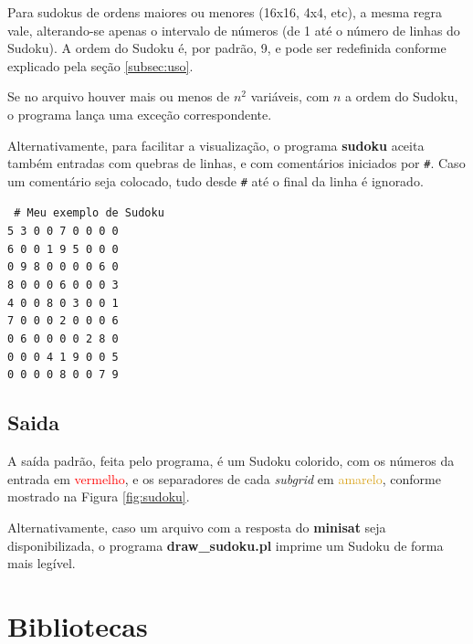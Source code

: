 \documentclass[a4paper]{article}
\begin{document}
    Para sudokus de ordens maiores ou menores (16x16, 4x4, etc), a mesma
    regra vale, alterando-se apenas o intervalo de números (de 1 até o 
    número de linhas do Sudoku). A ordem do Sudoku é, por padrão, 9, e 
    pode ser redefinida conforme explicado pela seção \ref{subsec:uso}.
    
    Se no arquivo houver mais ou menos de $n^2$ variáveis, com $n$ a 
    ordem do Sudoku, o programa lança uma exceção correspondente.
    
    Alternativamente, para facilitar a visualização, o programa 
    \textbf{sudoku} aceita também entradas com quebras de linhas, 
    e com comentários iniciados por \texttt{\#}. Caso um comentário 
    seja colocado, tudo desde \texttt{\#} até o final da linha é ignorado. 
    
    \begin{center}
    \texttt
    {
        \# Meu exemplo de Sudoku \\
        5 3 0 0 7 0 0 0 0 \\
        6 0 0 1 9 5 0 0 0 \\
        0 9 8 0 0 0 0 6 0 \\
        8 0 0 0 6 0 0 0 3 \\
        4 0 0 8 0 3 0 0 1 \\
        7 0 0 0 2 0 0 0 6 \\
        0 6 0 0 0 0 2 8 0 \\
        0 0 0 4 1 9 0 0 5 \\
        0 0 0 0 8 0 0 7 9 
    }
    \end{center}
    
  \subsection{Saida}
  \label{subsec:saida}
  
    A saída padrão, feita pelo programa, é um Sudoku colorido, com os
    números da entrada em \textcolor{red}{vermelho}, e os separadores 
    de cada \emph{subgrid} em \textcolor{Goldenrod}{amarelo}, conforme 
    mostrado na Figura \ref{fig:sudoku}.
    
    Alternativamente, caso um arquivo com a resposta do \textbf{minisat}
    seja disponibilizada, o programa \textbf{draw\_sudoku.pl} imprime um
    Sudoku de forma mais legível.

\newpage %

\section{Bibliotecas}
\label{sec:bibliotecas}
  
\end{document}
